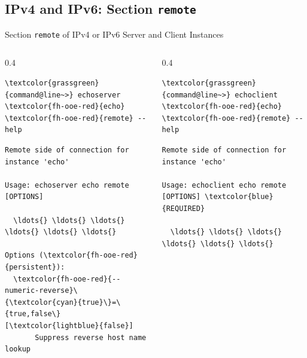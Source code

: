 ﻿\subsection{IPv4 and IPv6: Section \textcolor{fh-ooe-red}{\lstinline|remote|}}

\begin{frame}[fragile]{Section \alert{\lstinline|remote|} of IPv4 or IPv6 Server and Client Instances}
\begin{columns}[T]
\begin{column}{0.4\textwidth}
\begin{scriptsize}
\begin{Verbatim}[commandchars=\\\{\}]
\textcolor{grassgreen}{command@line~>} echoserver \textcolor{fh-ooe-red}{echo} \textcolor{fh-ooe-red}{remote} --help
\end{Verbatim}
\begin{Verbatim}[commandchars=\\\{\},frame=leftline,rulecolor=\color{fh-ooe-red}]
Remote side of connection for instance 'echo'

Usage: echoserver echo remote [OPTIONS]

  \ldots{} \ldots{} \ldots{} \ldots{} \ldots{} \ldots{}

Options (\textcolor{fh-ooe-red}{persistent}):
  \textcolor{fh-ooe-red}{--numeric-reverse}\{\textcolor{cyan}{true}\}=\{true,false\} [\textcolor{lightblue}{false}]
       Suppress reverse host name lookup
\end{Verbatim}
\end{scriptsize}
\end{column}
\begin{column}{0.4\textwidth}
\begin{scriptsize}
\begin{Verbatim}[commandchars=\\\{\}]
\textcolor{grassgreen}{command@line~>} echoclient \textcolor{fh-ooe-red}{echo} \textcolor{fh-ooe-red}{remote} --help
\end{Verbatim}
\begin{Verbatim}[commandchars=\\\{\},frame=leftline,rulecolor=\color{fh-ooe-red}]
Remote side of connection for instance 'echo'

Usage: echoclient echo remote [OPTIONS] \textcolor{blue}{REQUIRED}

  \ldots{} \ldots{} \ldots{} \ldots{} \ldots{} \ldots{}


\end{Verbatim}
\end{scriptsize}
\end{column}
\end{columns}
\end{frame}
